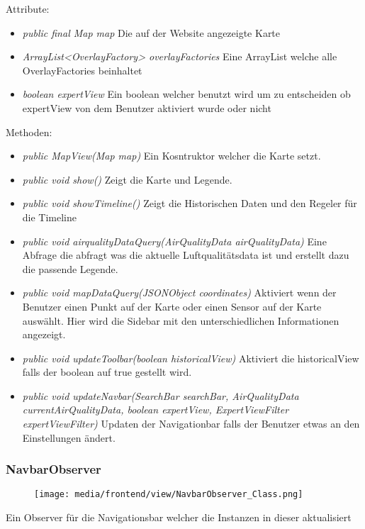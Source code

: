 Attribute:
\begin{itemize} 
    \item \emph{public final Map map} Die auf der Website angezeigte Karte
    \item \emph{ArrayList<OverlayFactory> overlayFactories} Eine ArrayList welche alle OverlayFactories beinhaltet
    \item \emph{boolean expertView} Ein boolean welcher benutzt wird um zu entscheiden ob expertView von dem Benutzer aktiviert wurde oder nicht
\end{itemize} 
Methoden:
\begin{itemize} 
    \item \emph{public MapView(Map map)} Ein Kosntruktor welcher die Karte setzt.
    \item \emph{public void show()} Zeigt die Karte und Legende.
    \item \emph{public void showTimeline()} Zeigt die Historischen Daten und den Regeler für die Timeline
    \item \emph{public void airqualityDataQuery(AirQualityData airQualityData)} Eine Abfrage die abfragt was die aktuelle Luftqualitätsdata ist und erstellt dazu die passende Legende. 
    \item \emph{public void mapDataQuery(JSONObject coordinates)} Aktiviert wenn der Benutzer einen Punkt auf der Karte oder einen Sensor auf der Karte auswählt. Hier wird die Sidebar mit den unterschiedlichen Informationen angezeigt.
    \item \emph{public void updateToolbar(boolean historicalView)} Aktiviert die historicalView falls der boolean auf true gestellt wird.
    \item \emph{public void updateNavbar(SearchBar searchBar, AirQualityData currentAirQualityData,
    boolean expertView, ExpertViewFilter expertViewFilter)} Updaten der Navigationbar falls der Benutzer etwas an den Einstellungen ändert.
\end{itemize} 

\subsubsection{NavbarObserver}
\begin{minipage}{0.3\textwidth}
    \begin{figure}[H]
        \texttt{[image: media/frontend/view/NavbarObserver\_Class.png]}
    \end{figure}
    \end{minipage} \hfill
    \begin{minipage}{0.6\textwidth}
Ein Observer für die Navigationsbar welcher die Instanzen in dieser aktualisiert
\end{minipage}

